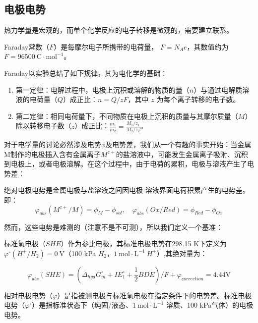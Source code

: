 \subsection{电极电势}

热力学量是宏观的，而单个化学反应的电子转移是微观的，需要建立联系。

\begin{definition}
Faraday常数（$F$）是每摩尔电子所携带的电荷量， $F = N_A e$，其数值约为 $F = 96500\ \mathrm{C\cdot mol^{-1}}$。
\end{definition}

Faraday以实验总结了如下规律，其为电化学的基础：

\begin{proposition}
\begin{enumerate}
    \item 第一定律：电解过程中，电极上沉积或溶解的物质的量（$n$）与通过电解质溶液的电荷量（$Q$）成正比：$n = {Q}/{zF}$，其中 $z$ 为每个离子转移的电子数。
    \item 第二定律：相同电荷量下，不同物质在电极上沉积的质量与其摩尔质量（$M$）除以转移电子数（$z$）成正比：$\frac{m_1}{m_2} = \frac{M_1/z_1}{M_2/z_2}$。
\end{enumerate}
\end{proposition}

对于电学量的讨论必然涉及电势$\phi $及电势差，我们从一个有趣的事实开始：当金属M制作的电极插入含有金属离子$M^{z+}$的盐溶液中，可能发生金属离子吸附、沉积到电极上，或者电极溶解。在这个过程中，由于电荷的累积，电极与溶液产生了电势差：

\begin{definition}[Trasatti绝对电极电势及其推广]
绝对电极电势是金属电极与盐溶液之间因电极-溶液界面电荷积累产生的电势差。即：
$$\varphi_{abs}(M^{z+}/M)=\phi_M - \phi_{sol}, \quad \varphi_{abs}(Ox/Red) = \phi_{Red} - \phi_{Ox} $$
\end{definition}

然而，这些电势是难测的（注意不是不可测），所以我们定义一个基准：

\begin{definition}[标准氢电极与相对电极电势]
标准氢电极（$SHE$）作为参比电极，其标准电极电势在298.15 K下定义为 $\varphi^\circ(H^+/H_2) = 0\ \mathrm{V}$（100 kPa $H_2$，$1\ \mathrm{mol\cdot L^{-1}}\ H^+$）,其绝对量为：

$$\varphi_{abs}(SHE) = (\varDelta_{hyd}G_m^\circ + IE_1^\circ +\frac{1}{2}BDE)/F + \varphi_{correction} = 4.44\text{V}$$

相对电极电势（$\varphi$）是指被测电极与标准氢电极在指定条件下的电势差。标准电极电势（$\varphi^\circ$）是指标准状态下（纯固/液态、$1\ \mathrm{mol\cdot L^{-1}}$ 溶质、100 kPa气体）的电极电势。
\end{definition}

